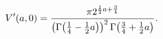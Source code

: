 \[\mathop{V\/}\nolimits'\!\left(a,0\right)=\frac{\pi 2^{\frac{1}{2}a+\frac{3}{4}%
}}{\left(\mathop{\Gamma\/}\nolimits\!\left(\frac{1}{4}-\frac{1}{2}a\right)%
\right)^{2}\mathop{\Gamma\/}\nolimits\!\left(\frac{3}{4}+\frac{1}{2}a\right)}.\]